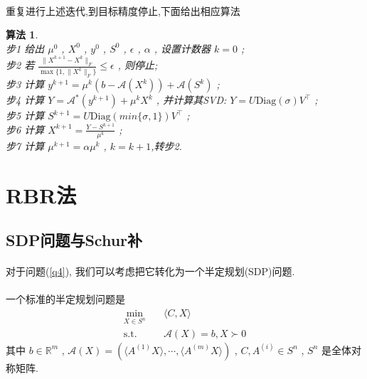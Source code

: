 \documentclass[a4paper, UTF8]{ctexart}				%
\newtheorem{algo}{\bf 算法}
\numberwithin{equation}{section}				%
\begin{document}
			\paragraph{}
				\quad 重复进行上述迭代,到目标精度停止,下面给出相应算法
				\begin{algo}
					\quad\\
					步1 \quad 给出 $\mu^0$ , $X^0$ , $y^0$ , $S^0$ , $\epsilon$ , $\alpha$ , 设置计数器 $k=0$ ;\\
					步2 \quad 若 $\frac{\lVert{X^{k + 1} - X^k}\rVert_F}{\max \{1, \lVert{X^k}\rVert_F\}} \leq \epsilon$ , 则停止;\\
					步3 \quad 计算 $y^{k + 1} = \mu^k (b - \mathcal{A}(X^k)) + \mathcal{A}(S^k)$ ;\\
					步4 \quad 计算 $Y = \mathcal{A}^*(y^{k + 1}) + \mu^k X^k$ , 并计算其SVD: $Y = U \text{Diag}(\sigma) V^\top$ ;\\
					步5 \quad 计算 $S^{k + 1} = U \text{Diag}(min \{\sigma, 1\}) V^\top$ ;\\
					步6 \quad 计算 $X^{k + 1} = \frac{Y - S^{k + 1}}{\mu^k}$ ;\\
					步7 \quad 计算 $\mu^{k + 1} = \alpha \mu^k$ , $k = k + 1$,转步2.
				\end{algo}

	\section{RBR法}
		\subsection{SDP问题与Schur补}
			\paragraph{}
				\quad 对于问题(\ref{q4}), 我们可以考虑把它转化为一个半定规划(SDP)问题.

			\paragraph{}
				\quad 一个标准的半定规划问题是
				\begin{equation}
					\begin{split}\label{SDP}
						\min_{X \in S^n} \quad
							& \langle{C, X}\rangle\\
						\text{s.t.} \quad
							& \mathcal{A}(X) = b, X \succ 0
					\end{split}
				\end{equation}
				其中 $b \in \mathbb{R}^{m}$ , $\mathcal{A}(X) = (\langle{A^{(1)} X}\rangle, \cdots, \langle{A^{(m)} X}\rangle)$ , $C, A^{(i)}\in S^n$ , $S^n$ 是全体对称矩阵.
\end{document}
